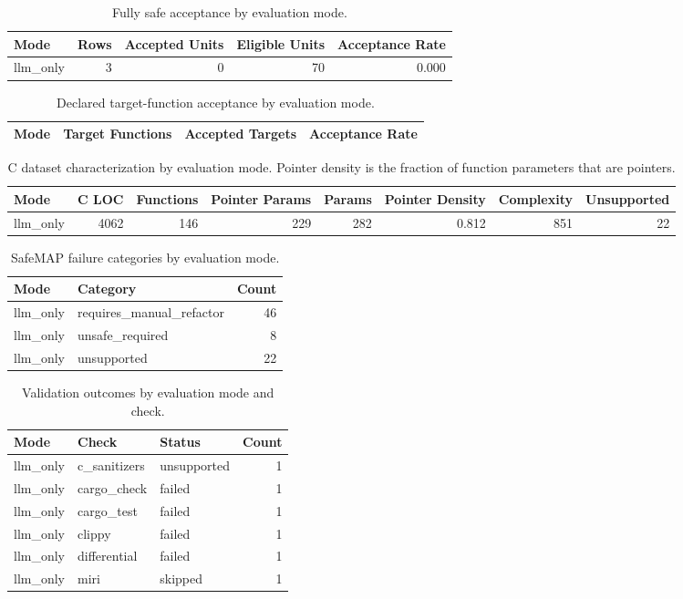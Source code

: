 \begin{table}[t]
\centering
\caption{Fully safe acceptance by evaluation mode.}
\label{tab:safemap-mode-summary}
\begin{tabular}{lrrrr}
\hline
Mode & Rows & Accepted Units & Eligible Units & Acceptance Rate \\
\hline
llm\_only & 3 & 0 & 70 & 0.000 \\
\hline
\end{tabular}
\end{table}

\begin{table}[t]
\centering
\caption{Declared target-function acceptance by evaluation mode.}
\label{tab:safemap-target-summary}
\begin{tabular}{lrrr}
\hline
Mode & Target Functions & Accepted Targets & Acceptance Rate \\
\hline
\hline
\end{tabular}
\end{table}

\begin{table}[t]
\centering
\caption{C dataset characterization by evaluation mode. Pointer density is the fraction of function parameters that are pointers.}
\label{tab:safemap-dataset-characterization}
\begin{tabular}{lrrrrrrr}
\hline
Mode & C LOC & Functions & Pointer Params & Params & Pointer Density & Complexity & Unsupported \\
\hline
llm\_only & 4062 & 146 & 229 & 282 & 0.812 & 851 & 22 \\
\hline
\end{tabular}
\end{table}

\begin{table}[t]
\centering
\caption{SafeMAP failure categories by evaluation mode.}
\label{tab:safemap-failure-summary}
\begin{tabular}{llr}
\hline
Mode & Category & Count \\
\hline
llm\_only & requires\_manual\_refactor & 46 \\
llm\_only & unsafe\_required & 8 \\
llm\_only & unsupported & 22 \\
\hline
\end{tabular}
\end{table}

\begin{table}[t]
\centering
\caption{Validation outcomes by evaluation mode and check.}
\label{tab:safemap-validation-statuses}
\begin{tabular}{lllr}
\hline
Mode & Check & Status & Count \\
\hline
llm\_only & c\_sanitizers & unsupported & 1 \\
llm\_only & cargo\_check & failed & 1 \\
llm\_only & cargo\_test & failed & 1 \\
llm\_only & clippy & failed & 1 \\
llm\_only & differential & failed & 1 \\
llm\_only & miri & skipped & 1 \\
\hline
\end{tabular}
\end{table}
